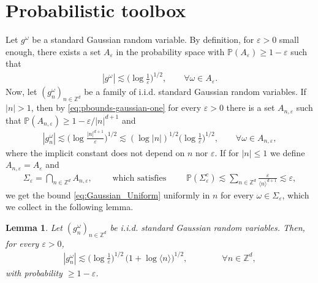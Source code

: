 \documentclass[11pt, xcolor = dvipsnames,reqno
]{amsart}
\newtheorem{lem}[thm]{Lemma}
\theoremstyle{definition}
\theoremstyle{remark}
\begin{document}
    


\section{Probabilistic toolbox}
    \label{app:probprel}  
    Let $g^{\omega}$ be a standard Gaussian random variable.
    By definition, for $\varepsilon > 0$ small enough, there exists a set $A_\varepsilon$ in the probability space with $\mathbb{P}(A_\varepsilon) \geq 1 - \varepsilon$ such that
        \begin{align}\label{eq:pbounds-gaussian-one}
            |g^{\omega}| \lesssim \Big( \log \frac{1}{\varepsilon} \Big)^{1/2}, \qquad \forall \omega \in A_\varepsilon.
        \end{align}
    Now, let $(g_n^{\omega})_{n \in \mathbb Z^d}$ be a family of i.i.d. standard Gaussian random variables. 
    If $|n| > 1$, then by \eqref{eq:pbounds-gaussian-one} for every $\varepsilon > 0$ there is a set 
    $A_{n,\varepsilon}$
    such that $\mathbb{P}(A_{n,\varepsilon}) \geq 1 - \varepsilon/|n|^{d+1}$ and
    \begin{align}\label{eq:Gaussian_Uniform}
        |g_n^{\omega}| 
        \lesssim \Big( \log \frac{|n|^{d + 1}}{\varepsilon} \Big)^{1/2}  \lesssim (\log |n|)^{1/2}  \Big( \log \frac{1}{\varepsilon} \Big)^{1/2}, 
        \qquad \forall \omega \in A_{n,\varepsilon},
    \end{align}
    where the implicit constant does not depend on $n$ nor $\varepsilon$.
    If for $|n| \leq 1$ we define $A_{n,\varepsilon} = A_\varepsilon$ and 
    \begin{align*}
        \Sigma_{\varepsilon} = \bigcap_{n \in \mathbb{Z}^d} A_{n,\varepsilon},
        \qquad \text{ which satisfies } \qquad 
        \mathbb P(\Sigma_{\varepsilon}^c) \lesssim  \sum_{n \in \mathbb{Z}^d} \frac{\varepsilon}{\langle n \rangle^{d + 1}} \lesssim \varepsilon , 
    \end{align*}
    we get the bound \eqref{eq:Gaussian_Uniform} uniformly in $n$ for every $\omega \in \Sigma_\varepsilon$, 
    which we collect in the following lemma. 

    \begin{lem}\label{lem:pbound-gn}
    Let $(g_n^{\omega})_{n \in \mathbb Z^d}$ be i.i.d. standard Gaussian random variables. Then, for every $\varepsilon > 0$,  
        \begin{align}\label{eq:pbound-gn}
        |g_n^{\omega}|
        \lesssim  \Big( \log \frac{1}{\varepsilon} \Big)^{1/2} \, \big( 1 + \log \langle n \rangle \big)^{1/2}, \qquad \qquad \forall n \in \mathbb{Z}^d, 
    \end{align}
    with probability $\geq 1 - \varepsilon$.
    \end{lem}
\end{document}
